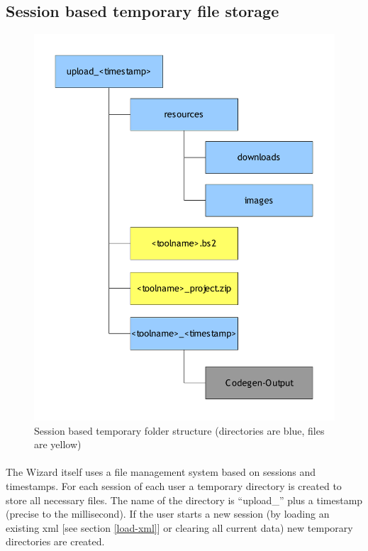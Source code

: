 \documentclass[a4paper,10pt]{book}
\begin{document}
\subsection{Session based temporary file storage}
\begin{figure}
 \includegraphics[scale=0.6]{resources/tempFileManagement.pdf}
\caption{Session based temporary folder structure (directories are blue, files are yellow)}
\end{figure}

\paragraph{} The Wizard itself uses a file management system based on sessions and timestamps. For each session of each user a temporary directory is created to store all necessary files. The name of the directory is ``upload\_'' plus a timestamp (precise to the millisecond). If the user starts a new session (by loading an existing xml [see section \ref{load-xml}] or clearing all current data) new temporary directories are created.
\end{document}
